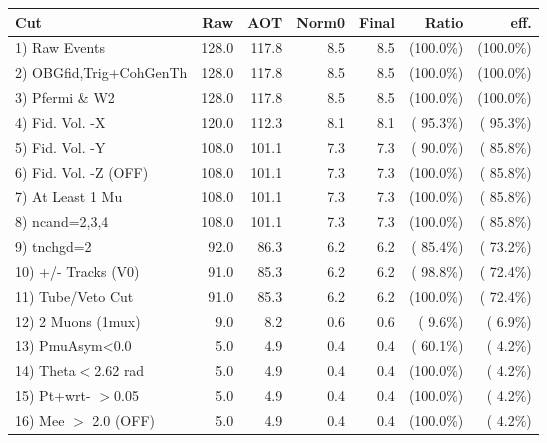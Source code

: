  \begin{table}[h!]\centering
 \begin{tabular}{||l||r|r|r|r|r|r||}
 \hline
 \hline
 Cut & Raw & AOT & Norm0 & Final & Ratio & eff.       \\
 \hline
  1) Raw Events           &        128.0 &        117.8 &          8.5 &          8.5 & (100.0\%) & (100.0\%) \\
  2) OBGfid,Trig+CohGenTh &        128.0 &        117.8 &          8.5 &          8.5 & (100.0\%) & (100.0\%) \\
  3) Pfermi \& W2         &        128.0 &        117.8 &          8.5 &          8.5 & (100.0\%) & (100.0\%) \\
  4) Fid. Vol. -X         &        120.0 &        112.3 &          8.1 &          8.1 & ( 95.3\%) & ( 95.3\%) \\
  5) Fid. Vol. -Y         &        108.0 &        101.1 &          7.3 &          7.3 & ( 90.0\%) & ( 85.8\%) \\
  6) Fid. Vol. -Z (OFF)   &        108.0 &        101.1 &          7.3 &          7.3 & (100.0\%) & ( 85.8\%) \\
  7) At Least 1 Mu        &        108.0 &        101.1 &          7.3 &          7.3 & (100.0\%) & ( 85.8\%) \\
  8) ncand=2,3,4          &        108.0 &        101.1 &          7.3 &          7.3 & (100.0\%) & ( 85.8\%) \\
  9) tnchgd=2             &         92.0 &         86.3 &          6.2 &          6.2 & ( 85.4\%) & ( 73.2\%) \\
 10) +/- Tracks (V0)      &         91.0 &         85.3 &          6.2 &          6.2 & ( 98.8\%) & ( 72.4\%) \\
 11) Tube/Veto Cut        &         91.0 &         85.3 &          6.2 &          6.2 & (100.0\%) & ( 72.4\%) \\
 12) 2 Muons (1mux)       &          9.0 &          8.2 &          0.6 &          0.6 & (  9.6\%) & (  6.9\%) \\
 13) PmuAsym<0.0          &          5.0 &          4.9 &          0.4 &          0.4 & ( 60.1\%) & (  4.2\%) \\
 14) Theta$<$2.62 rad     &          5.0 &          4.9 &          0.4 &          0.4 & (100.0\%) & (  4.2\%) \\
 15) Pt+wrt- $>$0.05      &          5.0 &          4.9 &          0.4 &          0.4 & (100.0\%) & (  4.2\%) \\
 16) Mee $>$ 2.0  (OFF)   &          5.0 &          4.9 &          0.4 &          0.4 & (100.0\%) & (  4.2\%) \\

\end{tabular}
\end{table}
